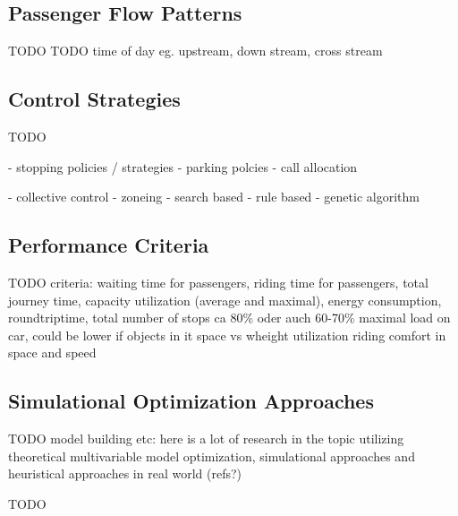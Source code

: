 \subsection{Passenger Flow Patterns}
TODO
TODO time of day eg. upstream, down stream, cross stream

\autocite[][pp.~1--2]{beers2015arrivals}
\autocite[][pp.~6--7]{axelsson2013strategies}
\autocite[][p.~194]{unger2015aufzuege}

\subsection{Control Strategies}
TODO

\autocite[][pp.~3--4,10]{beers2015arrivals}
- stopping policies / strategies
- parking polcies
- call allocation

\autocite[][pp.~3--6]{axelsson2013strategies}
- collective control
- zoneing
- search based
- rule based
- genetic algorithm




\subsection{Performance Criteria}
TODO
criteria: waiting time for passengers, riding time for passengers, total journey time, capacity utilization (average and maximal), energy consumption, roundtriptime, total number of stops
ca 80\% oder auch 60-70\% maximal load on car, could be lower if objects in it
space vs wheight utilization
riding comfort in space and speed

\autocite[][p.~10]{beers2015arrivals}


\subsection{Simulational Optimization Approaches}
TODO
model building etc: here is a lot of research in the topic utilizing theoretical multivariable model optimization, simulational approaches and heuristical approaches in real world (refs?)

\autocite[][pp.~7--11]{beers2015arrivals}
\autocite[][p.~193]{unger2015aufzuege}


TODO
